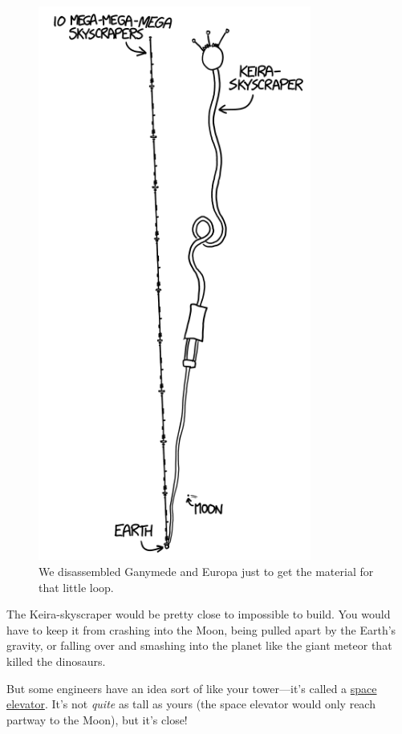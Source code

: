 {\begin{figure}[!htbp]
\centering
\includegraphics[scale=0.5, max width=0.8\textwidth]{imgs/a/94/billion_100x100x100x100x10.png}
\caption{We disassembled Ganymede and Europa just to get the material for that little loop.}
\end{figure}

{The Keira-skyscraper would be pretty close to impossible to build. You would have to keep it from crashing into the Moon, being pulled apart by the Earth's gravity, or falling over and smashing into the planet like the giant meteor that killed the dinosaurs.}

{But some engineers have an idea sort of like your tower—it's called a \href{http://en.wikipedia.org/wiki/Space\_elevator}{space elevator}. It's not \emph{quite} as tall as yours (the space elevator would only reach partway to the Moon), but it's close!}

}
